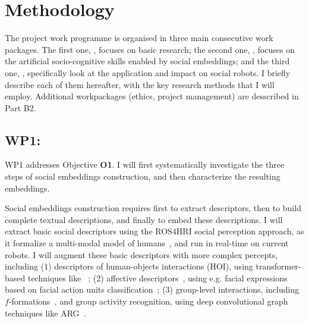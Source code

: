 %



\section{Methodology}

The \project project work programme is organised in three main consecutive work
packages. The first one, \emph{\wpOne}, focuses on basic research;
the second one, \emph{\wpTwo}, focuses on the artificial socio-cognitive skills
enabled by social embeddings; and the third one, \emph{\wpThree}, specifically
look at the application and impact on social robots.
I briefly describe each of them hereafter, with the key research methods that I
will employ. Additional workpackages (ethics, project management) are desscribed
in Part B2.


\subsection{WP1: \textbf{\wpOne}}

WP1 addresses Objective \textbf{O1}. I will first systematically investigate the
three steps of social embeddings construction, and then characterize the
resulting embeddings.

Social embeddings construction requires first to extract descriptors, then to
build complete textual descriptions, and finally to embed these descriptions.  I
will extract basic social descriptors using the ROS4HRI social perception
approach, as it formalize a multi-modal model of humans~\cite{lemaignan2022ros},
and run in real-time on current robots. I will augment these basic descriptors
with more complex percepts, including (1) descriptors of human-objects
interactions (HOI), using transformer-based techniques
like~\cite{iftekhar2022what} ; (2) affective
descriptors~\cite{vinciarelli2009social}, using e.g. facial expressions based on
facial action units classification~\cite{martinez2019automatic}; (3) group-level
interactions, including $f$-formations~\cite{setti2015fformation}, and group
activity recognition, using deep convolutional graph techniques like
ARG~\cite{wu2019learning}.

